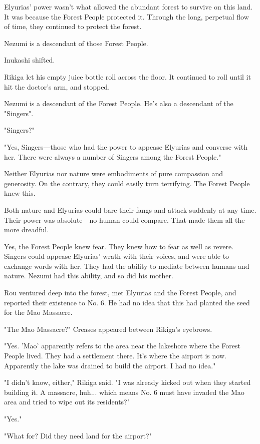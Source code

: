 Elyurias' power wasn't what allowed the abundant forest to survive on
this land. It was because the Forest People protected it. Through the
long, perpetual flow of time, they continued to protect the forest.

Nezumi is a descendant of those Forest People.

Inukashi shifted.

Rikiga let his empty juice bottle roll across the floor. It continued to
roll until it hit the doctor's arm, and stopped.

Nezumi is a descendant of the Forest People. He's also a descendant of
the "Singers".

"Singers?"

"Yes, Singers―those who had the power to appease Elyurias and converse
with her. There were always a number of Singers among the Forest
People."

Neither Elyurias nor nature were embodiments of pure compassion and
generosity. On the contrary, they could easily turn terrifying. The
Forest People knew this.

Both nature and Elyurias could bare their fangs and attack suddenly at
any time. Their power was absolute―no human could compare. That made
them all the more dreadful.

Yes, the Forest People knew fear. They knew how to fear as well as
revere. Singers could appease Elyurias' wrath with their voices, and
were able to exchange words with her. They had the ability to mediate
between humans and nature. Nezumi had this ability, and so did his
mother.

Rou ventured deep into the forest, met Elyurias and the Forest People,
and reported their existence to No. 6. He had no idea that this had
planted the seed for the Mao Massacre.

"The Mao Massacre?" Creases appeared between Rikiga's eyebrows.

"Yes. 'Mao' apparently refers to the area near the lakeshore where the
Forest People lived. They had a settlement there. It's where the airport
is now. Apparently the lake was drained to build the airport. I had no
idea."

"I didn't know, either," Rikiga said. "I was already kicked out when
they started building it. A massacre, huh... which means No. 6 must have
invaded the Mao area and tried to wipe out its residents?"

"Yes."

"What for? Did they need land for the airport?"

